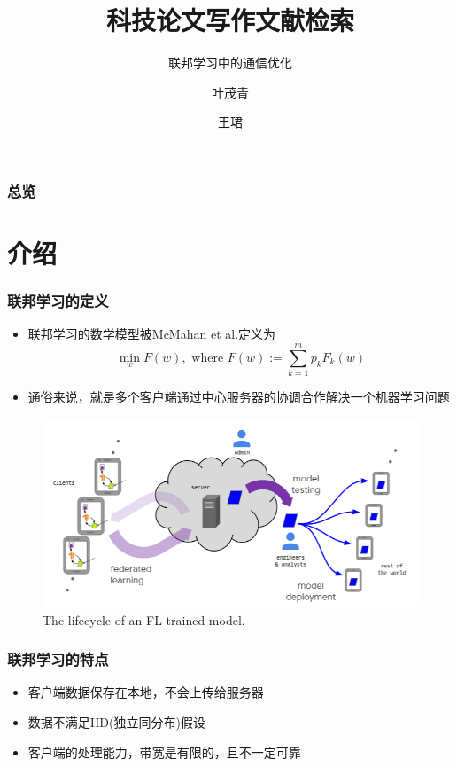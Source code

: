\documentclass[hyperref={pdfpagelabels=false}]{beamer}
\title{科技论文写作文献检索}
\subtitle{联邦学习中的通信优化}
\author{叶茂青 \and 王珺}
\date{\displaydate{date}}
\begin{document}
\begin{frame}
\titlepage
\begin{center}
\end{center}
\end{frame} 

\begin{frame}
	\frametitle{总览}
	\tableofcontents
\end{frame} 

\section{介绍}
\begin{frame}
	\tableofcontents[currentsection]
\end{frame} 

\begin{frame}
	\frametitle{联邦学习的定义}
	\begin{itemize}
		\item 联邦学习的数学模型被McMahan et al.\cite{McMahan2016}定义为$$\min _{w} F(w), \text { where } F(w):=\sum_{k=1}^{m} p_{k} F_{k}(w)$$
		\item 通俗来说，就是多个客户端通过中心服务器的协调合作解决一个机器学习问题
	\end{itemize}
	\begin{figure}
		\centering
		\includegraphics[width=.6\textwidth]{./figure/1.png}
		\caption{The lifecycle of an FL-trained model.\cite{Kairouz2019}}
	\end{figure}
\end{frame}


\begin{frame}
	\frametitle{联邦学习的特点}
	\begin{itemize}
		\item<+-> 客户端数据保存在本地，不会上传给服务器
		\item<+-> 数据不满足IID(独立同分布)假设
		\item<+-> 客户端的处理能力，带宽是有限的，且不一定可靠
	\end{itemize}
\end{frame}
\end{document}
